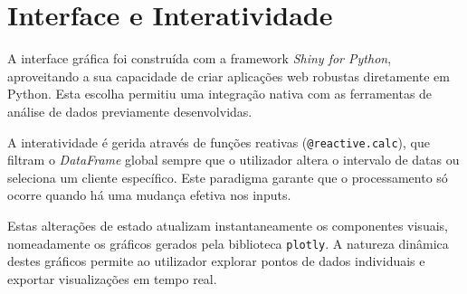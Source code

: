 \section{Interface e Interatividade}

A interface gráfica foi construída com a framework \textit{Shiny for Python}, aproveitando a sua capacidade de criar aplicações web robustas diretamente em Python. Esta escolha permitiu uma integração nativa com as ferramentas de análise de dados previamente desenvolvidas.

\vspace{0.5cm}

A interatividade é gerida através de funções reativas (\verb|@reactive.calc|), que filtram o \textit{DataFrame} global sempre que o utilizador altera o intervalo de datas ou seleciona um cliente específico. Este paradigma garante que o processamento só ocorre quando há uma mudança efetiva nos inputs.

\vspace{0.5cm}

Estas alterações de estado atualizam instantaneamente os componentes visuais, nomeadamente os gráficos gerados pela biblioteca \texttt{plotly}. A natureza dinâmica destes gráficos permite ao utilizador explorar pontos de dados individuais e exportar visualizações em tempo real.









